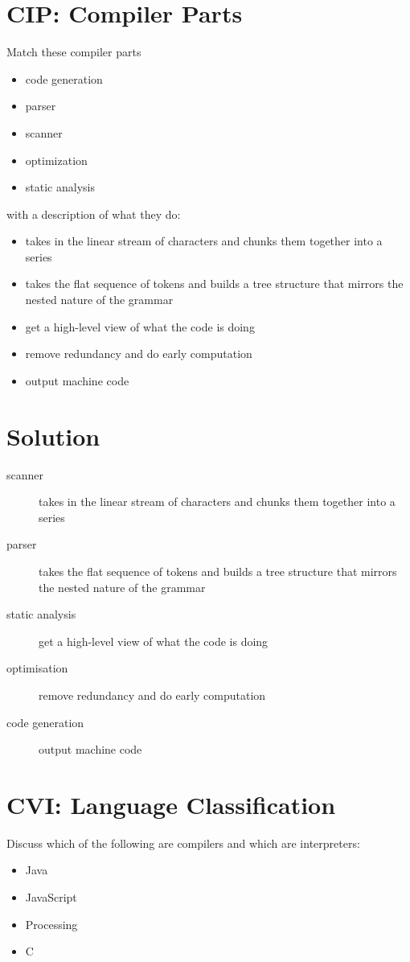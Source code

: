 \documentclass[twoside=false, DIV=14]{scrartcl}
\begin{document}
\section*{CIP: Compiler Parts}
\begin{minipage}[t]{0.4\textwidth}
Match these compiler parts 
\begin{itemize}
  \item code generation 
  \item parser 
  \item scanner
  \item optimization
  \item static analysis
\end{itemize}
\end{minipage}
\hspace{2em}
\begin{minipage}[t]{0.4\textwidth}
with a description of what they do:
\begin{itemize}
  \item takes in the linear stream of characters and chunks them together into a series
  \item takes the flat sequence of tokens and builds a tree structure that mirrors the nested nature of the grammar
  \item get a high-level view of what the code is doing
  \item remove redundancy and do early computation
  \item output machine code
\end{itemize}
\end{minipage}

\section*{Solution}
\begin{description}
  \item[scanner] takes in the linear stream of characters and chunks them together into a series
  \item[parser] takes the flat sequence of tokens and builds a tree structure that mirrors the nested nature of the grammar
  \item[static analysis] get a high-level view of what the code is doing
  \item[optimisation] remove redundancy and do early computation
  \item[code generation] output machine code
\end{description}
\section*{CVI: Language Classification}
  Discuss which of the following are compilers and which are interpreters:
  \begin{itemize}
    \renewcommand{\labelitemi}{$\square$}
    \item Java
    \item JavaScript
    \item Processing
    \item C
  \end{itemize}
  
\end{document}
